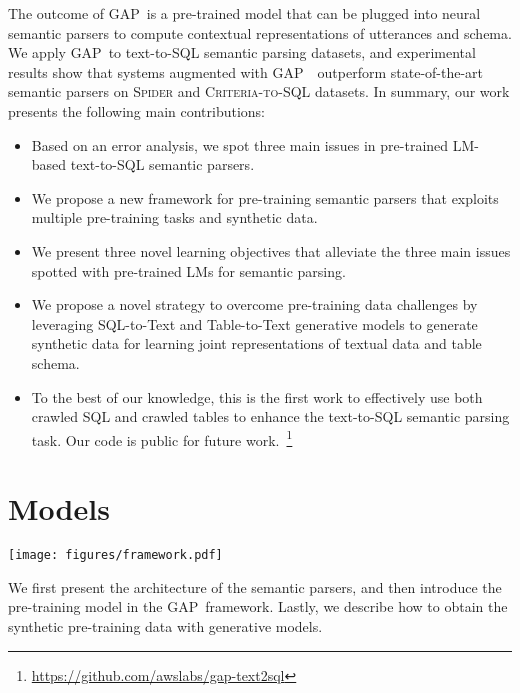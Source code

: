 \documentclass[letterpaper]{article} \usepackage{aaai21}  \usepackage{times}  \usepackage{helvet} \usepackage{courier}  \usepackage[hyphens]{url}  \usepackage{graphicx} \usepackage{booktabs}
\newcommand{\modelname}{\textsc{GAP~}}
\begin{document}
The outcome of \modelname is a pre-trained model that can be plugged into neural semantic parsers to compute contextual representations of utterances and schema.
We apply \modelname to text-to-SQL semantic parsing datasets, and experimental results show that systems augmented with \modelname~outperform state-of-the-art semantic parsers on \textsc{Spider} and \textsc{Criteria-to-SQL} datasets.
In summary, our work presents the following main contributions:
\begin{itemize}
    \item Based on an error analysis, we spot three main issues in pre-trained LM-based text-to-SQL semantic parsers.
    \item We propose a new framework for pre-training semantic parsers that exploits multiple pre-training tasks and synthetic data.
    \item We present three novel learning objectives that alleviate the three main issues spotted with pre-trained LMs for semantic parsing. 
    \item We propose a novel strategy to overcome pre-training data challenges by leveraging SQL-to-Text and Table-to-Text generative models to generate synthetic data for learning joint representations of textual data and table schema. 
    \item To the best of our knowledge, this is the first work to effectively use both crawled SQL and crawled tables to enhance the text-to-SQL semantic parsing task. Our code is public for future work.~\footnote{\url{https://github.com/awslabs/gap-text2sql}} 
\end{itemize}

\section{Models}

\begin{figure*}[t]
    \centering
    \texttt{[image: figures/framework.pdf]}
    \caption{Building blocks of GAP framework. On the left side we illustrate our proposed pre-training tasks. On the right side we depict our proposed data generation strategies.}
    \label{fig:arch}
\end{figure*}

We first present the architecture of the semantic parsers, and then introduce the pre-training model in the \modelname framework. Lastly, we describe how to obtain the synthetic pre-training data with generative models.
\end{document}
